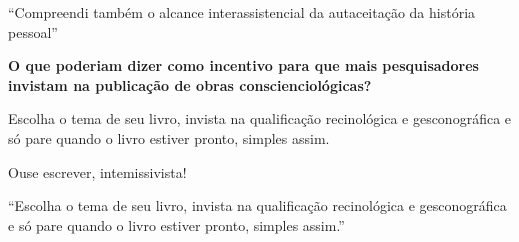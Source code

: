 \documentclass{gescons}
\begin{document}
\begin{multicols}{2}
\begin{pullquote}
``Compreendi também o alcance interassistencial da autaceitação da história pessoal''
\end{pullquote}


\textbf{O que poderiam dizer como incentivo para que mais pesquisadores invistam na publicação de obras conscienciológicas?}

Escolha o tema de seu livro, invista na qualificação recinológica e gesconográfica e só pare quando o livro estiver pronto, simples assim. 

Ouse escrever, intemissivista!

\begin{pullquote}
``Escolha o tema de seu livro, invista na qualificação recinológica e gesconográfica e só pare quando o livro estiver pronto, simples assim.''
\end{pullquote}



    
    \end{multicols}
\end{document}
